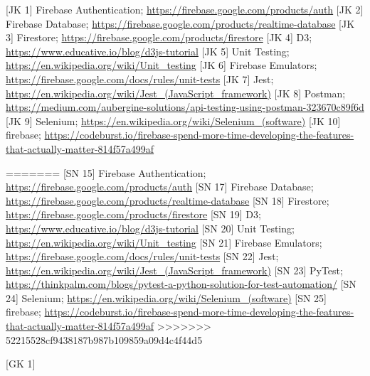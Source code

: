 [JK 1] Firebase Authentication; \url{https://firebase.google.com/products/auth}
[JK 2] Firebase Database; \url{https://firebase.google.com/products/realtime-database}
[JK 3] Firestore; \url{https://firebase.google.com/products/firestore}
[JK 4] D3; \url{https://www.educative.io/blog/d3js-tutorial}
[JK 5] Unit Testing; \url{https://en.wikipedia.org/wiki/Unit_testing}
[JK 6] Firebase Emulators; \url{https://firebase.google.com/docs/rules/unit-tests}
[JK 7] Jest; \url{https://en.wikipedia.org/wiki/Jest_(JavaScript_framework)}
[JK 8] Postman; \url{https://medium.com/aubergine-solutions/api-testing-using-postman-323670c89f6d}
[JK 9] Selenium; \url{https://en.wikipedia.org/wiki/Selenium_(software)}
[JK 10] firebase; \url{https://codeburst.io/firebase-spend-more-time-developing-the-features-that-actually-matter-814f57a499af}

=======
[SN 15] Firebase Authentication; \url{https://firebase.google.com/products/auth}
[SN 17] Firebase Database; \url{https://firebase.google.com/products/realtime-database}
[SN 18] Firestore; \url{https://firebase.google.com/products/firestore}
[SN 19] D3; \url{https://www.educative.io/blog/d3js-tutorial}
[SN 20] Unit Testing; \url{https://en.wikipedia.org/wiki/Unit_testing}
[SN 21] Firebase Emulators; \url{https://firebase.google.com/docs/rules/unit-tests}
[SN 22] Jest; \url{https://en.wikipedia.org/wiki/Jest_(JavaScript_framework)}
[SN 23] PyTest; \url{https://thinkpalm.com/blogs/pytest-a-python-solution-for-test-automation/}
[SN 24] Selenium; \url{https://en.wikipedia.org/wiki/Selenium_(software)}
[SN 25] firebase; \url{https://codeburst.io/firebase-spend-more-time-developing-the-features-that-actually-matter-814f57a499af}
>>>>>>> 52215528cf9438187b987b109859a09d4c4f44d5

[GK 1] 
